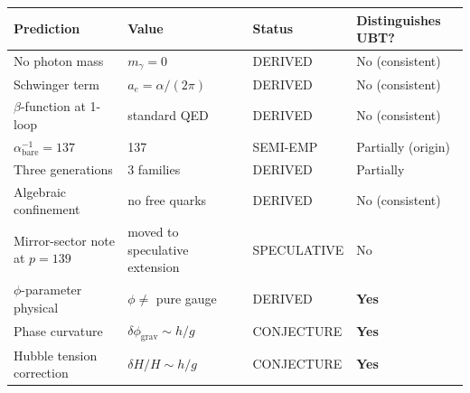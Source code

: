 \documentclass[11pt,a4paper]{article}
\theoremstyle{definition}
\theoremstyle{remark}
\begin{document}
\begin{center}
\begin{longtable}{llll}
\toprule
Prediction & Value & Status & Distinguishes UBT? \\
\midrule
No photon mass & $m_\gamma = 0$ & DERIVED & No (consistent) \\
Schwinger term & $a_e = \alpha/(2\pi)$ & DERIVED & No (consistent) \\
$\beta$-function at 1-loop & standard QED & DERIVED & No (consistent) \\
$\alpha^{-1}_{\mathrm{bare}} = 137$ & 137 & SEMI-EMP & Partially (origin) \\
Three generations & 3 families & DERIVED & Partially \\
Algebraic confinement & no free quarks & DERIVED & No (consistent) \\
Mirror-sector note at $p=139$ & moved to speculative extension & SPECULATIVE & No \\
$\phi$-parameter physical & $\phi \neq$ pure gauge & DERIVED & \textbf{Yes} \\
Phase curvature & $\delta\phi_{\mathrm{grav}}\sim h/g$ & CONJECTURE & \textbf{Yes} \\
Hubble tension correction & $\delta H/H \sim h/g$ & CONJECTURE & \textbf{Yes} \\
\bottomrule
\end{longtable}
\end{center}
\end{document}
